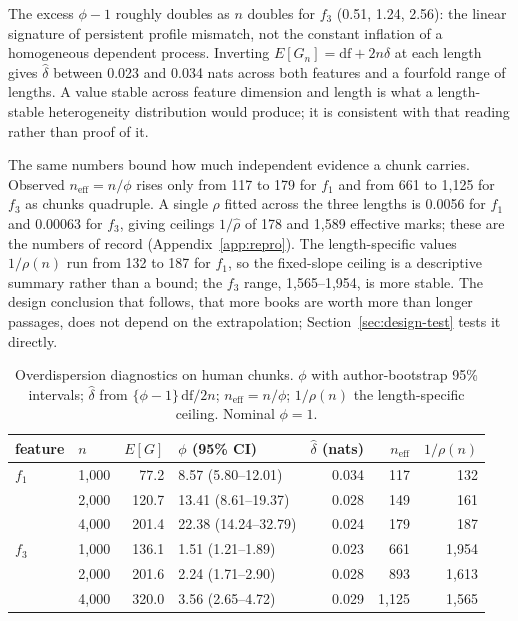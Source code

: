 \documentclass[11pt]{article}
\newcommand{\fOne}{\ensuremath{f_1}\xspace}
\newcommand{\fThree}{\ensuremath{f_3}\xspace}
\begin{document}
The excess \(\phi - 1\) roughly doubles as \(n\) doubles for \fThree
(0.51, 1.24, 2.56): the linear signature of persistent profile mismatch,
not the constant inflation of a homogeneous dependent process.  Inverting
\(E[G_n] = \mathrm{df} + 2n\delta\) at each length gives \(\widehat\delta\)
between 0.023 and 0.034 nats across both features and a fourfold range of
lengths.  A value stable across feature dimension and length is what a
length-stable heterogeneity distribution would produce; it is consistent
with that reading rather than proof of it.

The same numbers bound how much independent evidence a chunk carries.
Observed \(n_{\mathrm{eff}} = n/\phi\) rises only from 117 to 179 for
\fOne and from 661 to 1,125 for \fThree as chunks quadruple.  A single
\(\rho\) fitted across the three lengths is 0.0056 for \fOne and 0.00063
for \fThree, giving ceilings \(1/\widehat\rho\) of 178 and 1,589 effective
marks; these are the numbers of record (Appendix~\ref{app:repro}).  The
length-specific values \(1/\rho(n)\) run from 132 to 187 for \fOne, so
the fixed-slope ceiling is a descriptive summary rather than a bound; the
\fThree range, 1,565--1,954, is more stable.  The design conclusion that
follows, that more books are worth more than longer passages, does not
depend on the extrapolation; Section~\ref{sec:design-test} tests it
directly.

\begin{table}[htbp]
  \centering
  \caption{Overdispersion diagnostics on human chunks.  \(\phi\) with
  author-bootstrap 95\% intervals; \(\widehat\delta\) from
  \(\{\phi-1\}\,\mathrm{df}/2n\); \(n_{\mathrm{eff}} = n/\phi\);
  \(1/\rho(n)\) the length-specific ceiling.  Nominal \(\phi = 1\).}
  \label{tab:phi}
  \begin{tabular}{llrlrrr}
    \toprule
    feature & \(n\) & \(E[G]\) & \(\phi\) (95\% CI) & \(\widehat\delta\) (nats)
      & \(n_{\mathrm{eff}}\) & \(1/\rho(n)\) \\
    \midrule
    \fOne   & 1,000 &  77.2 &  8.57 (5.80--12.01)  & 0.034 &   117 &   132 \\
            & 2,000 & 120.7 & 13.41 (8.61--19.37)  & 0.028 &   149 &   161 \\
            & 4,000 & 201.4 & 22.38 (14.24--32.79) & 0.024 &   179 &   187 \\
    \addlinespace
    \fThree & 1,000 & 136.1 &  1.51 (1.21--1.89)   & 0.023 &   661 & 1,954 \\
            & 2,000 & 201.6 &  2.24 (1.71--2.90)   & 0.028 &   893 & 1,613 \\
            & 4,000 & 320.0 &  3.56 (2.65--4.72)   & 0.029 & 1,125 & 1,565 \\
    \bottomrule
  \end{tabular}
\end{table}
\end{document}
